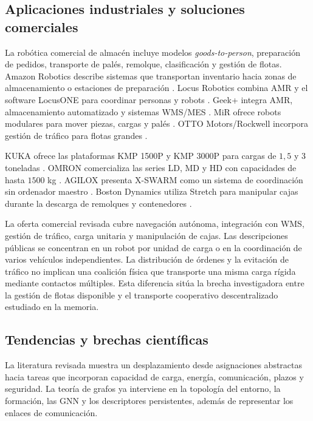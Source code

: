 \subsection{Aplicaciones industriales y soluciones comerciales}

La robótica comercial de almacén incluye modelos \emph{goods-to-person}, preparación de
pedidos, transporte de palés, remolque, clasificación y gestión de flotas. Amazon Robotics
describe sistemas que transportan inventario hacia zonas de almacenamiento o estaciones de
preparación \citep{amazon2026robotsFulfillment}. Locus Robotics combina AMR y el software LocusONE
para coordinar personas y robots \citep{locusRobotics2026}. Geek+ integra AMR,
almacenamiento automatizado y sistemas WMS/MES \citep{geekplus2026}. MiR ofrece robots
modulares para mover piezas, cargas y palés \citep{mirRobots2026}. OTTO Motors/Rockwell
incorpora gestión de tráfico para flotas grandes \citep{ottoFleet2026}.

KUKA ofrece las plataformas KMP 1500P y KMP 3000P para cargas de $1{,}5$ y $3$ toneladas
\citep{kukaAmr2026}. OMRON comercializa las series LD, MD y HD con capacidades de hasta
$1500$ kg \citep{omronRobotics2026}. AGILOX presenta X-SWARM como un sistema de
coordinación sin ordenador maestro \citep{agilox2026}. Boston Dynamics utiliza Stretch
para manipular cajas durante la descarga de remolques y contenedores
\citep{bostonStretch2026}.

La oferta comercial revisada cubre navegación autónoma, integración con WMS, gestión de
tráfico, carga unitaria y manipulación de cajas. Las descripciones públicas se concentran
en un robot por unidad de carga o en la coordinación de varios vehículos independientes.
La distribución de órdenes y la evitación de tráfico no implican una coalición física que
transporte una misma carga rígida mediante contactos múltiples. Esta diferencia sitúa la
brecha investigadora entre la gestión de flotas disponible y el transporte cooperativo
descentralizado estudiado en la memoria.

\subsection{Tendencias y brechas científicas}

La literatura revisada muestra un desplazamiento desde asignaciones abstractas hacia tareas
que incorporan capacidad de carga, energía, comunicación, plazos y seguridad. La teoría de
grafos ya interviene en la topología del entorno, la formación, las GNN y los descriptores
persistentes, además de representar los enlaces de comunicación.

